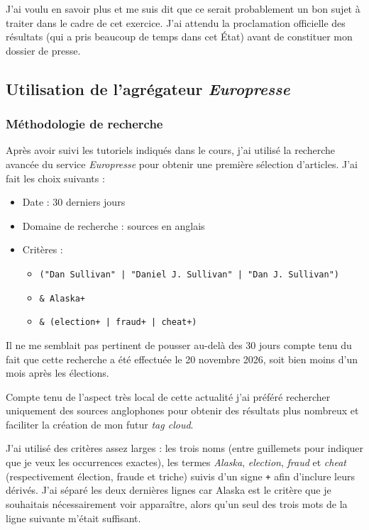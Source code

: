 J'ai voulu en savoir plus et me suis dit que ce serait probablement un bon sujet à traiter dans le cadre de cet exercice. J'ai attendu la proclamation officielle des résultats (qui a pris beaucoup de temps dans cet État) avant de constituer mon dossier de presse.

\subsection{Utilisation de l'agrégateur \textit{Europresse}}
\subsubsection{Méthodologie de recherche}
Après avoir suivi les tutoriels indiqués dans le cours, j'ai utilisé la recherche avancée du service \textit{Europresse} pour obtenir une première sélection d'articles. J'ai fait les choix suivants :
    \begin{itemize}
        \item Date : 30 derniers jours
        \item Domaine de recherche : sources en anglais
        \item Critères :
            \begin{itemize}
                \item \verb!("Dan Sullivan" | "Daniel J. Sullivan" | "Dan J. Sullivan")!
                \item \verb!& Alaska+!
                \item \verb!& (election+ | fraud+ | cheat+)!
            \end{itemize}
    \end{itemize}

Il ne me semblait pas pertinent de pousser au-delà des 30 jours compte tenu du fait que cette recherche a été effectuée le 20 novembre 2026, soit bien moins d'un mois après les élections.

Compte tenu de l'aspect très local de cette actualité j'ai préféré rechercher uniquement des sources anglophones pour obtenir des résultats plus nombreux et faciliter la création de mon futur \textit{tag cloud}.

J'ai utilisé des critères assez larges : les trois noms (entre guillemets pour indiquer que je veux les occurrences exactes), les termes \textit{Alaska}, \textit{election}, \textit{fraud} et \textit{cheat} (respectivement élection, fraude et triche) suivis d'un signe \verb|+| afin d'inclure leurs dérivés. J'ai séparé les deux dernières lignes car Alaska est le critère que je souhaitais nécessairement voir apparaître, alors qu'un seul des trois mots de la ligne suivante m'était suffisant.

